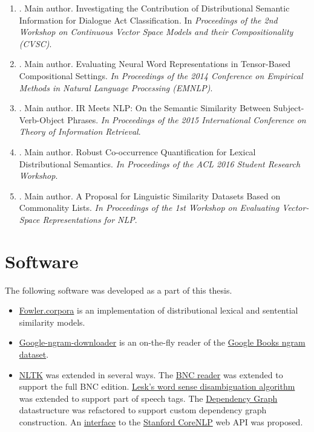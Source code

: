 \begin{enumerate}
\item \citet*{milajevs-purver:2014:CVSC}. Main author. Investigating the
  Contribution of Distributional Semantic Information for Dialogue Act
  Classification. In \textit{Proceedings of the 2nd Workshop on Continuous Vector Space Models and their Compositionality (CVSC)}.
\item \citet*{milajevs-EtAl:2014:EMNLP2014}. Main author. Evaluating Neural Word
  Representations in Tensor-Based Compositional Settings. \textit{In Proceedings of the 2014 Conference on Empirical Methods in Natural Language Processing (EMNLP)}.
\item \citet*{Milajevs:2015:IMN:2808194.2809448}. Main author. IR Meets NLP: On
  the Semantic Similarity Between Subject-Verb-Object Phrases. \textit{In Proceedings of the 2015 International Conference on Theory of Information Retrieval}.
\item \citet*{milajevs-sadrzadeh-purver:2016:ACL-SRW}. Main author. Robust Co-occurrence Quantification for Lexical Distributional Semantics. \textit{In Proceedings of the ACL 2016 Student Research Workshop}.
\item \citet*{milajevs-griffiths:2016:repeval}. Main author. A Proposal for Linguistic Similarity Datasets Based on Commonality Lists. \textit{In Proceedings of the 1st Workshop on Evaluating Vector-Space Representations for NLP}.
\end{enumerate}

\chapter*{Software}

The following software was developed as a part of this thesis.
\begin{itemize}
\item \href{http://fowlercorpora.readthedocs.io/en/latest/}{Fowler.corpora} is an implementation of distributional lexical and sentential similarity models.
\item \href{https://pypi.python.org/pypi/google-ngram-downloader}{Google-ngram-downloader} is an on-the-fly reader of the \href{http://storage.googleapis.com/books/ngrams/books/datasetsv2.html}{Google Books ngram dataset}.
\item \href{http://www.nltk.org/}{NLTK} was extended in several ways. The \href{https://github.com/nltk/nltk/blob/develop/nltk/corpus/reader/bnc.py}{BNC reader} was extended to support the full BNC edition. \href{https://github.com/nltk/nltk/blob/develop/nltk/wsd.py}{Lesk's word sense disambiguation algorithm} was extended to support part of speech tags. The \href{https://github.com/nltk/nltk/blob/develop/nltk/parse/dependencygraph.py}{Dependency Graph} datastructure was refactored to support custom dependency graph construction. An \href{https://github.com/nltk/nltk/pull/1249}{interface} to the \href{http://stanfordnlp.github.io/CoreNLP/}{Stanford CoreNLP} web API was proposed.
\end{itemize}

